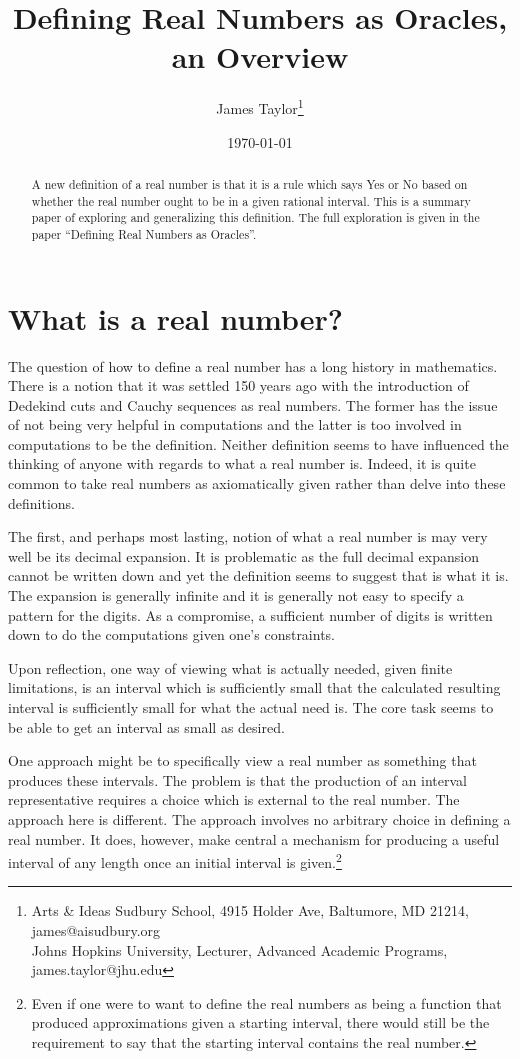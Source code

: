 \documentclass[12pt]{article}
\title{Defining Real Numbers as Oracles, an Overview}
\author{
  James Taylor\footnote{Arts \& Ideas Sudbury School, 4915 Holder Ave, Baltumore, MD 21214, james@aisudbury.org \\
  \hspace*{15px} Johns Hopkins University, Lecturer, Advanced Academic Programs, james.taylor@jhu.edu}
}
\date{\today}
\theoremstyle{remark}
\begin{document}
\maketitle
\begin{abstract}
A new definition of a real number is that it is a rule which says Yes or No based on whether the real number ought to be in a given rational interval. This is a summary paper of exploring and generalizing this definition. The full exploration is given in the paper ``Defining Real Numbers as Oracles''. 
\end{abstract}



\section{What is a real number?}

The question of how to define a real number has a long history in mathematics. There is a notion that it was settled 150 years ago with the introduction of Dedekind cuts and Cauchy sequences as real numbers. The former has the issue of not being very helpful in computations and the latter is too involved in computations to be the definition. Neither definition seems to have influenced the thinking of anyone with regards to what a real number is. Indeed, it is quite common to take real numbers as axiomatically given rather than delve into these definitions.

The first, and perhaps most lasting, notion of what a real number is may very well be its decimal expansion. It is problematic as the full decimal expansion cannot be written down and yet the definition seems to suggest that is what it is. The expansion is generally infinite and it is generally not easy to specify a pattern for the digits. As a compromise, a sufficient number of digits is written down to do the computations given one's constraints.  

Upon reflection, one way of viewing what is actually needed, given finite limitations, is an interval which is sufficiently small that the calculated resulting interval is sufficiently small for what the actual need is. The core task seems to be able to get an interval as small as desired. 

One approach might be to specifically view a real number as something that produces these intervals. The problem is that the production of an interval representative requires a choice which is external to the real number. The approach here is different. The approach involves no arbitrary choice in defining a real number. It does, however, make central a mechanism for producing a useful interval of any length once an initial interval is given.\footnote{Even if one were to want to define the real numbers as being a function that produced approximations given a starting interval, there would still be the requirement to say that the starting interval contains the real number.}
\end{document}
